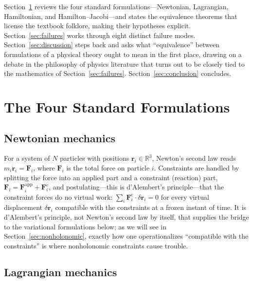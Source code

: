\documentclass[11pt]{article}
\newcommand{\R}{\mathbb{R}}
\begin{document}
Section~\ref{sec:standard} reviews the four standard formulations---Newtonian, Lagrangian, Hamiltonian, and Hamilton--Jacobi---and states the equivalence theorems that license the textbook folklore, making their hypotheses explicit. Section~\ref{sec:failures} works through eight distinct failure modes. Section~\ref{sec:discussion} steps back and asks what ``equivalence'' between formulations of a physical theory ought to mean in the first place, drawing on a debate in the philosophy of physics literature that turns out to be closely tied to the mathematics of Section~\ref{sec:failures}. Section~\ref{sec:conclusion} concludes.

\section{The Four Standard Formulations}
\label{sec:standard}

\subsection{Newtonian mechanics}

For a system of $N$ particles with positions $\mathbf{r}_i \in \R^3$, Newton's second law reads $m_i \ddot{\mathbf{r}}_i = \mathbf{F}_i$, where $\mathbf{F}_i$ is the total force on particle $i$. Constraints are handled by splitting the force into an applied part and a constraint (reaction) part, $\mathbf{F}_i = \mathbf{F}_i^{\mathrm{app}} + \mathbf{F}_i^{\mathrm{c}}$, and postulating---this is d'Alembert's principle---that the constraint forces do no virtual work: $\sum_i \mathbf{F}_i^{\mathrm{c}}\cdot \delta \mathbf{r}_i = 0$ for every virtual displacement $\delta\mathbf{r}_i$ compatible with the constraints at a frozen instant of time. It is d'Alembert's principle, not Newton's second law by itself, that supplies the bridge to the variational formulations below; as we will see in Section~\ref{sec:nonholonomic}, exactly how one operationalizes ``compatible with the constraints'' is where nonholonomic constraints cause trouble.

\subsection{Lagrangian mechanics}
\end{document}
